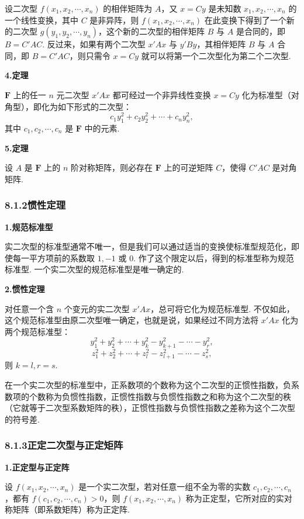 \documentclass[UTF8, 12pt, fontset=fandol, oneside]{ctexart}
\begin{document}
设二次型 $f(x_1,x_2,\cdots,x_n)$ 的相伴矩阵为 $A$，又 $x=Cy$ 是未知数 $x_1,x_2,\cdots,x_n$ 的一个线性变换，其中 $C$ 是非异阵，则 $f(x_1,x_2,\cdots,x_n)$ 在此变换下得到了一个新的二次型 $g(y_1,y_2,\cdots,y_n)$，这个新的二次型的相伴矩阵 $B$ 与 $A$ 是合同的，即 $B=C'AC$. 反过来，如果有两个二次型 $x'Ax$ 与 $y'By$，其相伴矩阵 $B$ 与 $A$ 合同，即 $B=C'AC$，则只需令 $x=Cy$ 就可以将第一个二次型化为第二个二次型.

\noindent\textbf{4.\quad 定理}

$\mathbf{F}$ 上的任一 $n$ 元二次型 $x'Ax$ 都可经过一个非异线性变换 $x=Cy$ 化为标准型（对角型），即化为如下形式的二次型：
\[
c_1y_1^2+c_2y_2^2+\cdots+c_ny_n^2,
\]
其中 $c_1,c_2,\cdots,c_n$ 是 $\mathbf{F}$ 中的元素.

\noindent\textbf{5.\quad 定理}

设 $A$ 是 $\mathbf{F}$ 上的 $n$ 阶对称矩阵，则必存在 $\mathbf{F}$ 上的可逆矩阵 $C$，使得 $C'AC$ 是对角矩阵.

\subsubsection*{8.1.2\quad 惯性定理}

\noindent\textbf{1.\quad 规范标准型}

实二次型的标准型通常不唯一，但是我们可以通过适当的变换使标准型规范化，即使每一平方项前的系数取 $1,-1$ 或 $0$. 作了这个限定以后，得到的标准型称为规范标准型. 一个实二次型的规范标准型是唯一确定的.

\noindent\textbf{2.\quad 惯性定理}

对任意一个含 $n$ 个变元的实二次型 $x'Ax$，总可将它化为规范标准型. 不仅如此，这个规范标准型由原二次型唯一确定，也就是说，如果经过不同方法将 $x'Ax$ 化为两个规范标准型：
\[
y_1^2+y_2^2+\cdots+y_k^2-y_{k+1}^2-\cdots-y_r^2,
\]
\[
z_1^2+z_2^2+\cdots+z_l^2-z_{l+1}^2-\cdots-z_s^2,
\]
则 $k=l,r=s$.

在一个实二次型的标准型中，正系数项的个数称为这个二次型的正惯性指数，负系数项的个数称为负惯性指数，正惯性指数与负惯性指数之和称为这个二次型的秩（它就等于二次型系数矩阵的秩），正惯性指数与负惯性指数之差称为这个二次型的符号差.

\subsubsection*{8.1.3\quad 正定二次型与正定矩阵}

\noindent\textbf{1.\quad 正定型与正定阵}

设 $f(x_1,x_2,\cdots,x_n)$ 是一个实二次型，若对任意一组不全为零的实数 $c_1,c_2,\cdots,c_n$，都有 $f(c_1,c_2,\cdots,c_n)>0$，则 $f(x_1,x_2,\cdots,x_n)$ 称为正定型，它所对应的实对称矩阵（即系数矩阵）称为正定阵.
\end{document}
